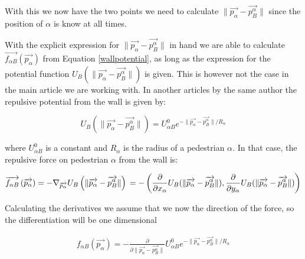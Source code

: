 With this we now have the two points we need to calculate $\|\overrightarrow{p_{\alpha}} - \overrightarrow{p_{B}^{\alpha}}\|$ 
since the position of $\alpha$ is know at all times.

With the explicit expression for $ \| \overrightarrow{p_{\alpha}} - \overrightarrow{p_{B}^{\alpha}} \| $ 
in hand we are able to calculate $\overrightarrow{f_{\alpha B}} \left( \overrightarrow{p_{\alpha}} \right)$ from 
Equation \ref{wallpotential}, as long as the expression for the potential function 
$U_{B}\left( \| \overrightarrow{p_{\alpha}} - \overrightarrow{p_{B}^{\alpha}} \| \right)$ is given. This is 
however not the case in the main article we are working with. In another articles \cite{ABconstant} by 
the same author the repulsive potential from the wall is given by: 

\begin{equation}
U_{B} \left( \| \overrightarrow{p_{\alpha}} - \overrightarrow{p_{B}^{\alpha}} \| \right) =
U^0_{\alpha B} e^{- \| \overrightarrow{p_{\alpha}} - \overrightarrow{p_{B}^{\alpha}} \| / R_{\alpha} }
\end{equation}

where $U^0_{\alpha B}$ is a constant and $R_{\alpha}$ is the radius of a pedestrian $\alpha$.
In that case, the repulsive force on pedestrian $ \alpha $ from the wall is:

\begin{equation}
    \overrightarrow{f_{\alpha B}} \left( \overrightarrow{p_{\alpha}} \right) =
    - \nabla_{\overrightarrow{p_{\alpha}}} U_{B}
    \left( \| \overrightarrow{p_{\alpha}} - \overrightarrow{p_{B}^{\alpha}} \| \right)\\
=-\left( \frac{\partial}{\partial x_{\alpha}}U_{B}( \| \overrightarrow{p_{\alpha}} - \overrightarrow{p_{B}^{\alpha}} \|), \frac{\partial}{\partial y_{\alpha}}U_{B}( \| \overrightarrow{p_{\alpha}} - \overrightarrow{p_{B}^{\alpha}} \|)\right)
\end{equation}

Calculating the derivatives we assume that we now the direction of the force, so the differentiation will be one dimensional

\begin{equation}
\begin{split}
f_{\alpha B} \left( \overrightarrow{p_{\alpha}} \right) 
 = -\frac{\partial}{\partial \| \overrightarrow{p_{\alpha}} - \overrightarrow{p_{B}^{\alpha}} \|}U^0_{\alpha B} e^{- \| \overrightarrow{p_{\alpha}} - \overrightarrow{p_{B}^{\alpha}} \| / R_{\alpha} }
\end{split}
\end{equation}

